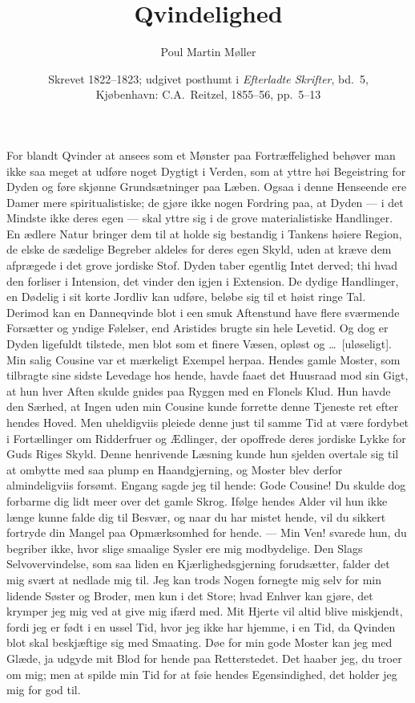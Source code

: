 \documentclass[12pt]{article}
\title{\textbf{Qvindelighed}}
\author{Poul Martin Møller}
\date{Skrevet 1822--1823; udgivet posthumt i \textit{Efterladte Skrifter},
  bd.~5,\\ Kjøbenhavn: C.A.\ Reitzel, 1855--56, pp.~5--13}
\newcommand{\opage}[1]{\marginnote{\footnotesize\textit{[#1]}}}
\begin{document}
\maketitle

\opage{5}For blandt Qvinder at ansees som et Mønster paa Fortræffelighed
behøver man ikke saa meget at udføre noget Dygtigt i Verden, som at yttre høi
Begeistring for Dyden og føre skjønne Grundsætninger paa Læben. Ogsaa i denne
Henseende ere Damer mere spiritualistiske; de gjøre ikke nogen Fordring paa, at
Dyden --- i det Mindste ikke deres egen --- skal yttre sig i de grove
materialistiske Handlinger. En ædlere Natur bringer dem til at holde sig
bestandig i Tankens høiere Region, de elske de sædelige Begreber aldeles for
deres egen Skyld, uden at kræve dem afprægede i det grove jordiske Stof. Dyden
taber egentlig Intet derved; thi hvad den forliser i Intension, det vinder den
igjen i Extension. De dydige Handlinger, en Dødelig i sit korte Jordliv kan
udføre, beløbe sig til et høist ringe Tal. Derimod kan en Danneqvinde blot i een
smuk Aftenstund have flere sværmende Forsætter og yndige Følelser, end Aristides
brugte sin hele Levetid. Og dog er Dyden ligefuldt tilstede, men blot som et
finere Væsen, opløst og \ldots\ [uløseligt]. Min salig Cousine var et mærkeligt
Exempel herpaa. Hendes gamle Moster, som tilbragte sine sidste Levedage hos
hende, havde faaet det Huusraad mod sin Gigt, at hun hver Aften skulde gnides paa
Ryggen med en Flonels Klud. Hun havde den Særhed, at Ingen uden min Cousine kunde
forrette denne Tjeneste ret efter hendes Hoved. Men uheldigviis pleiede denne
just til samme Tid at være fordybet i Fortællinger om Ridderfruer og Ædlinger,
der opoffrede deres jordiske Lykke for Guds Riges Skyld. Denne henrivende Læsning
\opage{6}kunde hun sjelden overtale sig til at ombytte med saa plump en
Haandgjerning, og Moster blev derfor almindeligviis forsømt. Engang sagde jeg til
hende: Gode Cousine! Du skulde dog forbarme dig lidt meer over det gamle Skrog.
Ifølge hendes Alder vil hun ikke længe kunne falde dig til Besvær, og naar du har
mistet hende, vil du sikkert fortryde din Mangel paa Opmærksomhed for hende. ---
Min Ven! svarede hun, du begriber ikke, hvor slige smaalige Sysler ere mig
modbydelige. Den Slags Selvovervindelse, som saa liden en Kjærlighedsgjerning
forudsætter, falder det mig svært at nedlade mig til. Jeg kan trods Nogen
fornegte mig selv for min lidende Søster og Broder, men kun i det Store; hvad
Enhver kan gjøre, det krymper jeg mig ved at give mig ifærd med. Mit Hjerte vil
altid blive miskjendt, fordi jeg er født i en ussel Tid, hvor jeg ikke har
hjemme, i en Tid, da Qvinden blot skal beskjæftige sig med Smaating. Døe for min
gode Moster kan jeg med Glæde, ja udgyde mit Blod for hende paa Retterstedet. Det
haaber jeg, du troer om mig; men at spilde min Tid for at føie hendes
Egensindighed, det holder jeg mig for god til.
\end{document}
